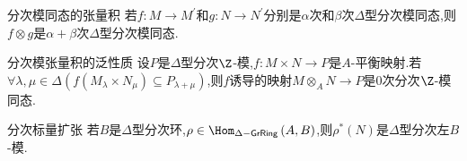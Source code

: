 \begin{proposition}{分次模同态的张量积}{}
	若$f:M\to M^{\prime}$和$g:N\to N^{\prime}$分别是$\alpha$次和$\beta$次$\Delta$型分次模同态,则$f\otimes g$是$\alpha+\beta$次$\Delta$型分次模同态.
\end{proposition}

\begin{proposition}{分次模张量积的泛性质}{}
	设$P$是$\Delta$型分次$\Z$-模,$f:M\times N\to P$是$A$-平衡映射.若$\forall\lambda,\mu\in\Delta\left(f\left(M_{\lambda}\times N_{\mu}\right)\subseteq P_{\lambda+\mu}\right)$,则$f$诱导的映射$M\otimes_{A}N\to P$是$0$次分次$\Z$-模同态.
\end{proposition}

\begin{proposition}{分次标量扩张}{}
	若$B$是$\Delta$型分次环,$\rho\in\Hom_{\Delta-\mathsf{GrRing}}\left(A,B\right)$,则$\rho^{\ast}\left(N\right)$是$\Delta$型分次左$B$-模.
\end{proposition}




